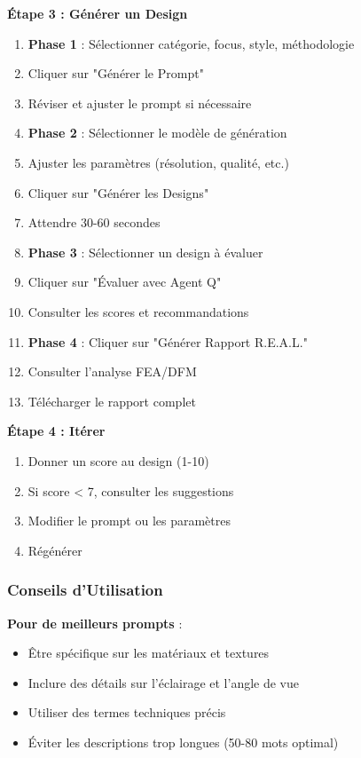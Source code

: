 \textbf{Étape 3 : Générer un Design}
\begin{enumerate}
    \item \textbf{Phase 1} : Sélectionner catégorie, focus, style, méthodologie
    \item Cliquer sur "Générer le Prompt"
    \item Réviser et ajuster le prompt si nécessaire
    \item \textbf{Phase 2} : Sélectionner le modèle de génération
    \item Ajuster les paramètres (résolution, qualité, etc.)
    \item Cliquer sur "Générer les Designs"
    \item Attendre 30-60 secondes
    \item \textbf{Phase 3} : Sélectionner un design à évaluer
    \item Cliquer sur "Évaluer avec Agent Q"
    \item Consulter les scores et recommandations
    \item \textbf{Phase 4} : Cliquer sur "Générer Rapport R.E.A.L."
    \item Consulter l'analyse FEA/DFM
    \item Télécharger le rapport complet
\end{enumerate}

\textbf{Étape 4 : Itérer}
\begin{enumerate}
    \item Donner un score au design (1-10)
    \item Si score < 7, consulter les suggestions
    \item Modifier le prompt ou les paramètres
    \item Régénérer
\end{enumerate}

\subsubsection{Conseils d'Utilisation}

\textbf{Pour de meilleurs prompts} :
\begin{itemize}
    \item Être spécifique sur les matériaux et textures
    \item Inclure des détails sur l'éclairage et l'angle de vue
    \item Utiliser des termes techniques précis
    \item Éviter les descriptions trop longues (50-80 mots optimal)
\end{itemize}

